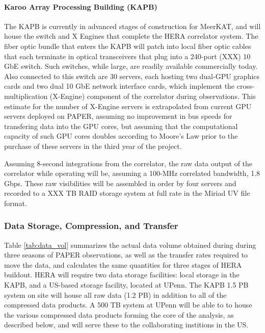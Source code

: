 \documentclass[preprint]{aastex}
\begin{document}
\paragraph{Karoo Array Processing Building (KAPB)}

The KAPB is currently
in advanced stages of construction for MeerKAT, and will house the switch and X Engines that
complete the HERA correlator system.  The fiber optic bundle that enters the KAPB will patch
into local fiber optic cables 
that each terminate in optical transceivers that plug into a 240-port (XXX) 10 GbE switch.
Such switches, while large, are readily available commercially today.  Also connected to
this switch are 30 servers, each hosting two dual-GPU graphics cards and two dual
10 GbE network interface cards, which implement the cross-multiplication (X-Engine) component
of the correlator during observations.  This estimate for the number of X-Engine servers
is extrapolated from current GPU servers deployed on PAPER, assuming no improvement in bus
speeds for transfering data into the GPU cores, but assuming that the computational
capacity of such GPU cores doubles according to Moore's Law prior to the purchase of
these servers in the third year of the project.

Assuming 8-second integrations from the correlator, the raw data output of the
correlator while operating will be, assuming a 100-MHz correlated bandwidth, 1.8 Gbps.
These raw visibilities will be assembled in order by four servers
and recorded to a XXX TB RAID storage system at full rate in the Miriad UV
file format.



\subsubsection{Data Storage, Compression, and Transfer}

Table \ref{tab:data_vol} summarizes the actual data volume obtained
during during three seasons of PAPER observations, as well as the
transfer rates required to move the data, and calculates the same
quantities for three stages of HERA buildout.  HERA will require two
data storage facilities: local storage in the KAPB, and a US-based
storage facility, located at UPenn. The KAPB 1.5 PB system on site
will house all raw data (1.2 PB) in addition to all of the compressed
data products. A 500 TB system at UPenn will be able to to house the
various compressed data products forming the core of the analysis, as
described below, and will serve these to the collaborating institions
in the US.
\end{document}
